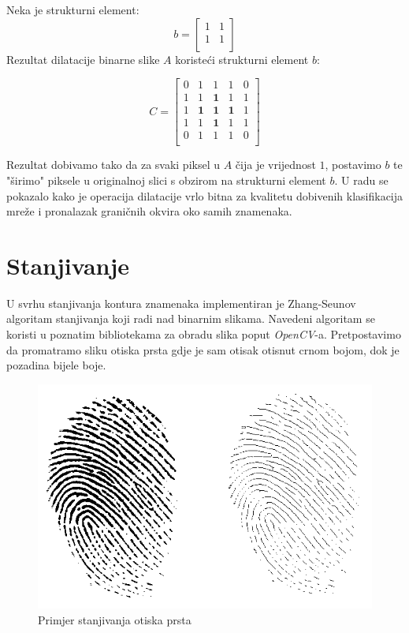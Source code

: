 \documentclass[times, utf8, diplomski]{fer}
\theoremstyle{definition}
\begin{document}
Neka je strukturni element:
\[
b=
\begin{bmatrix}
1 & 1\\
1 & 1\\
\end{bmatrix}
\]
Rezultat dilatacije binarne slike $A$ koristeći strukturni element $b$:

\[
C=
\begin{bmatrix}
0 & 1 & 1 & 1 & 0 \\
1 & 1 & \textbf{1} & 1 & 1 \\
1 & \textbf{1} & \textbf{1} & \textbf{1} & 1 \\
1 & 1 & \textbf{1} & 1 & 1 \\
0 & 1 & 1 & 1 & 0 \\

\end{bmatrix}
\]

Rezultat dobivamo tako da za svaki piksel u $A$ čija je vrijednost $1$, postavimo $b$ te "širimo" piksele u originalnoj slici s obzirom na strukturni element $b$. U radu se pokazalo kako je operacija dilatacije vrlo bitna za kvalitetu dobivenih klasifikacija mreže i pronalazak graničnih okvira oko samih znamenaka.

\section{Stanjivanje}
U svrhu stanjivanja kontura znamenaka implementiran je Zhang-Seunov algoritam stanjivanja koji radi nad binarnim slikama. Navedeni algoritam se koristi u poznatim bibliotekama za obradu slika poput \textit{OpenCV}-a. Pretpostavimo da promatramo sliku otiska prsta gdje je sam otisak otisnut crnom bojom, dok je pozadina bijele boje.

\begin{figure}[h]
\centering
\includegraphics[scale=0.46]{thinning.png}
\caption{Primjer stanjivanja otiska prsta}
\end{figure}
\end{document}
